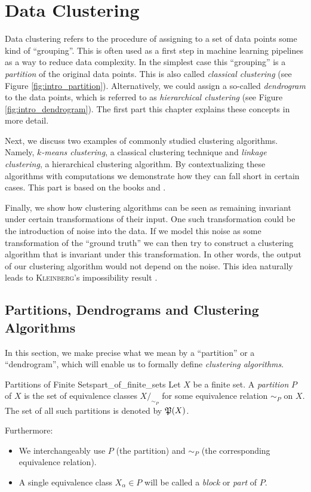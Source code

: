 \chapter{Data Clustering}
\label{chapter__dataclustering}

Data clustering refers to the procedure of assigning to a set of data points some kind of ``grouping''. 
This is often used as a first step in machine learning pipelines as a way to reduce data complexity.
In the simplest case this ``grouping'' is a \emph{partition} of the original data points. This is also called \emph{classical clustering} (see Figure \ref{fig:intro_partition}).
Alternatively, we could assign a so-called \emph{dendrogram}
to the data points, which is referred to as \emph{hierarchical clustering} (see Figure \ref{fig:intro_dendrogram}). The first part this chapter explains these concepts in more detail.

Next, we discuss two examples of commonly studied clustering algorithms. Namely, \emph{$k$-means clustering}, a classical clustering technique and \emph{linkage clustering}, a hierarchical clustering algorithm.
%
By contextualizing these algorithms with computations we demonstrate how they can fall short in certain cases.
This part is based on the books \cite{Everitt2011} and \cite{Scitovski2021}.

Finally, we show how clustering algorithms can be seen as remaining invariant under certain transformations of their input.
%
One such transformation could be the introduction of noise into the data.
If we model this noise as some transformation of the ``ground truth'' we can then try to construct a clustering algorithm that is invariant under this transformation. In other words, the output of our clustering algorithm would not depend on the noise. This idea naturally leads to \textsc{Kleinberg}'s impossibility result \cite{Kleinberg2002}.


\section{Partitions, Dendrograms and Clustering Algorithms}
\label{section__partitions}
In this section, we make precise what we mean by a ``partition'' or a ``dendrogram'', which will enable us to formally define \emph{clustering algorithms}.

\begin{definition}{Partitions of Finite Sets}{part_of_finite_sets}
Let $X$ be a finite set. A \emph{partition} $P$ of $X$ is the set of equivalence classes $X/_{\sim_P}$ for some equivalence relation $\sim_P$ on $X$. The set of all such partitions is denoted by $\P(X)$.\par

\medskip Furthermore:
\begin{itemize}
    \item We interchangeably use $P$ (the partition) and $\sim_P$ (the corresponding equivalence relation).
    \item A single equivalence class $X_\alpha \in P$ will be called a \emph{block} or \emph{part} of $P$.
\end{itemize}
\end{definition}

